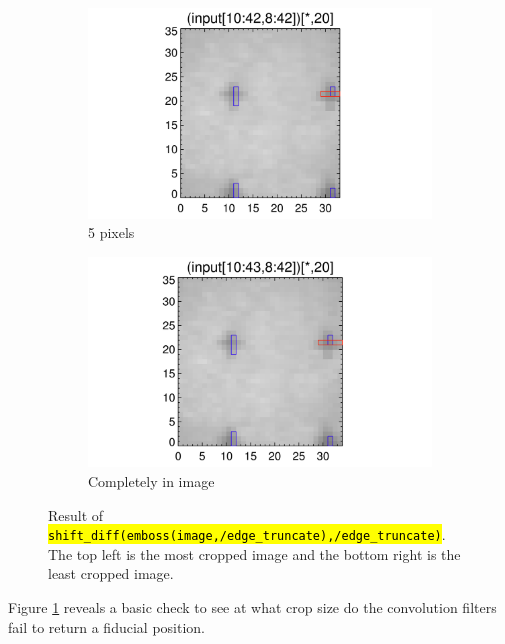 \documentclass[10pt]{article}
\begin{document}
\begin{figure}[!h]
    \begin{subfigure}[b]{.45\linewidth}
        \centering
        \includegraphics[width=1.3\textwidth]{../plots_tables_images/fidcheck_withbothtruncate4.png}
        \caption{5 pixels}
    \end{subfigure}
    \begin{subfigure}[b]{.45\linewidth}
        \centering
        \includegraphics[width=1.3\textwidth]{../plots_tables_images/fidcheck_withbothtruncate5.png}
        \caption{Completely in image}
    \end{subfigure}
    \caption{Result of \hl{\texttt{shift\_diff(emboss(image,/edge\_truncate),/edge\_truncate)}}. The top left is the most cropped image and the bottom right is the least cropped image.}
    \label{firstplot}
\end{figure}

Figure \ref{firstplot} reveals a basic check to see at what crop size do the convolution filters fail to return a fiducial position. 
\end{document}
